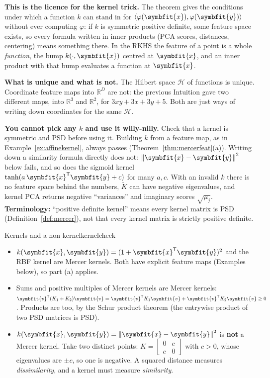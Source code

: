 \documentclass[11pt]{article}
\newcommand{\bm}[1]{\symbfit{#1}}
\newcommand{\R}{\mathbb{R}}
\newcommand{\vx}{\bm{x}}
\newcommand{\vy}{\bm{y}}
\newcommand{\T}{^{\mathsf T}}
\newcommand{\norm}[1]{\left\lVert #1\right\rVert}
\begin{document}
\begin{intuition}
\textbf{This is the licence for the kernel trick.} The theorem gives the conditions under which a function $k$ can stand
in for $\langle\varphi(\vx),\varphi(\vy)\rangle$ without ever computing $\varphi$: if $k$ is symmetric positive definite, some feature space
exists, so every formula written in inner products (PCA scores, distances, centering) means something there. In the RKHS the
feature of a point is a whole \emph{function}, the bump $k(\cdot,\vx)$ centred at $\vx$, and an inner product with that bump
evaluates a function at $\vx$.

\textbf{What is unique and what is not.} The Hilbert space $\mathcal H$ of functions is unique. Coordinate feature maps into
$\R^D$ are not: the previous Intuition gave two different maps, into $\R^3$ and $\R^2$, for $3xy+3x+3y+5$. Both are just ways of
writing down coordinates for the same $\mathcal H$.
\end{intuition}

\begin{careful}
\textbf{You cannot pick any $k$ and use it willy-nilly.} Check that a kernel is symmetric and PSD before using it. Building $k$
from a feature map, as in Example~\ref{ex:affinekernel}, always passes (Theorem~\ref{thm:mercerfeat}(a)). Writing down a similarity formula
directly does not: $\norm{\vx-\vy}^2$ below fails, and so does the sigmoid kernel $\tanh(a\,\vx\T\vy+c)$ for many $a,c$. With an invalid
$k$ there is no feature space behind the numbers, $\widetilde K$ can have negative eigenvalues, and kernel PCA returns negative ``variances''
and imaginary scores $\sqrt{\mu_j}$. \textbf{Terminology:} ``positive definite kernel'' means every kernel matrix is PSD
(Definition~\ref{def:mercer}), not that every kernel matrix is strictly positive definite.
\end{careful}

\begin{example}{Kernels and a non-kernel}{kernelcheck}
\begin{itemize}[nosep]
\item $k(\vx,\vy)=(1+\vx\T\vy)^2$ and the RBF kernel are Mercer kernels. Both have explicit feature maps (Examples below), so part (a) applies.
\item Sums and positive multiples of Mercer kernels are Mercer kernels: $\bm v\T(K_1+K_2)\bm v=\bm v\T K_1\bm v+\bm v\T K_2\bm v\ge0$. Products are too, by the Schur product theorem (the entrywise product of two PSD matrices is PSD).
\item $k(\vx,\vy)=\norm{\vx-\vy}^2$ is \textbf{not} a Mercer kernel. Take two distinct points: $K=\begin{bmatrix}0&c\\c&0\end{bmatrix}$ with $c>0$, whose eigenvalues are $\pm c$, so one is negative. A squared distance measures \emph{dissimilarity}, and a kernel must measure \emph{similarity}.
\end{itemize}
\end{example}
\end{document}
